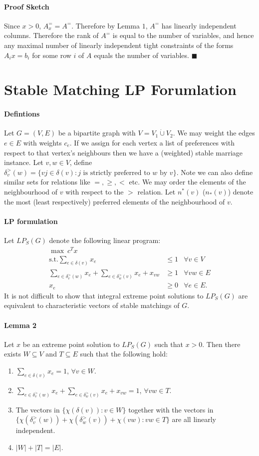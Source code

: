 \documentclass[letterpaper,12pt,oneside,onecolumn]{article}
\begin{document}
\paragraph{Proof Sketch}
Since $x > 0$, $A_x^= = A^=$. Therefore by Lemma $1$, $A^=$ has linearly independent columns. Therefore the rank of $A^=$ is equal to the number of variables, and hence any maximal number of linearly independent tight constraints of the forms $A_ix = b_i$ for some row $i$ of $A$ equals the number of variables. $\blacksquare$
\section{Stable Matching LP Forumlation}
\paragraph{Defintions}
Let $G = (V, E)$ be a bipartite graph with $V = V_1 \dot\cup V_2$. We may weight the edges $e \in E$ with weights $c_e$. If we assign for each vertex a list of preferences with respect to that vertex's neighbours then we have a (weighted) stable marriage instance. Let $v,w \in V$, define $\delta_v^>(w) = \{vj \in \delta(v): j \text{ is strictly preferred to } w \text{ by } v\}$. Note we can also define similar sets for relations like $=, \geq, <$ etc. We may order the elements of the neighbourhood of $v$ with respect to the $>$ relation. Let $n^*(v)$ ($n_*(v)$) denote the most (least respectively) preferred elements of the neighbourhood of $v$.
\paragraph{LP formulation}
Let $LP_S(G)$ denote the following linear program:
\begin{align*}
\max\ c^Tx \\
\text{s.t.} \sum_{e\in \delta(v)} x_e &\leq 1 &\forall v \in V\\
\sum_{e \in \delta_v^>(w)} x_e + \sum_{e \in \delta_w^>(v)} x_e + x_{vw} &\geq 1 &\forall vw \in E \\
x_e &\geq 0 &\forall e \in E.
\end{align*}
It is not difficult to show that integral extreme point solutions to $LP_S(G)$ are equivalent to characteristic vectors of stable matchings of $G$.
\paragraph{Lemma 2}
Let $x$ be an extreme point solution to $LP_S(G)$ such that $x>0$. Then there exists $W \subseteq V$ and $T \subseteq E$ such that the following hold:
\begin{enumerate}
\item $\sum_{e\in \delta(v)} x_e = 1$, $\forall v \in W$.
\item $\sum_{e \in \delta_v^>(w)} x_e + \sum_{e \in \delta_w^>(v)} x_e + x_{vw} = 1$, $\forall vw \in T$.
\item The vectors in $\{\chi(\delta(v)) : v \in W\}$ together with the vectors in $\{\chi(\delta_v^>(w)) + \chi(\delta_w^>(v)) + \chi(vw) : vw \in T\}$ are all linearly independent.
\item $|W| + |T| = |E|$.
\end{enumerate}
\end{document}
